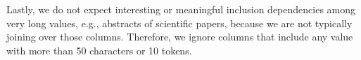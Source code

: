 Lastly, we do not expect interesting or meaningful inclusion dependencies among very long values, e.g., abstracts of scientific papers, because we are not typically joining over those columns.
Therefore, we ignore columns that include any value with more than 50 characters or 10 tokens.




